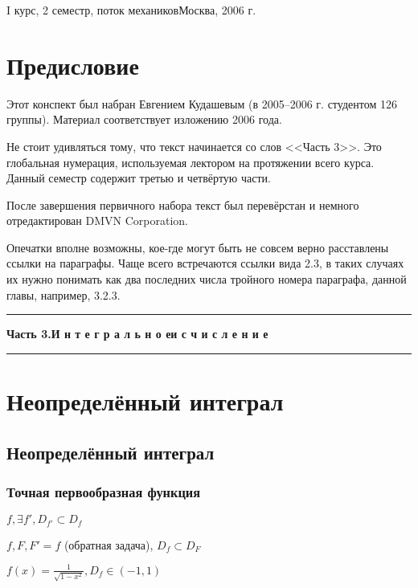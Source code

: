 \documentclass[a4paper]{article}
\begin{document}
{I курс, 2 семестр, поток механиков}{Москва, 2006 г.}

\pagebreak

\section*{Предисловие}

Этот конспект был набран Евгением Кудашевым (в 2005--2006 г. студентом 126 группы).
Материал соответствует изложению 2006 года.

Не стоит удивляться тому, что текст начинается со слов <<Часть 3>>. Это глобальная нумерация, используемая
лектором на протяжении всего курса. Данный семестр содержит третью и четвёртую части.


После завершения первичного набора текст был перевёрстан и немного отредактирован DMVN Corporation.

Опечатки вполне возможны, кое-где могут быть не совсем верно расставлены ссылки на параграфы.
Чаще всего встречаются ссылки вида 2.3, в таких случаях их нужно понимать как два последних числа
тройного номера параграфа, данной главы, например, 3.2.3.

\medskip
\dmvntrail


\tableofcontents
\pagebreak


\hrule\begin{center}\LARGE \bf Часть 3.\hfill И н т е г р а л ь н о е\quad и с ч и с л е н и е\end{center}\hrule

\section{Неопределённый интеграл}

\subsection{Неопределённый интеграл}

\subsubsection{Точная первообразная функция}

$f, \exists f', D_{f'} \subset D_f$

$f, F, F'=f$ (обратная задача), $D_f \subset D_F$

$f(x)=\frac{1}{\sqrt{1-x^2}}, D_f \in (-1,1)$
\end{document}
